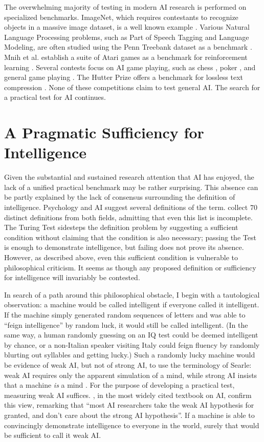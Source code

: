 The overwhelming majority of testing in modern AI research is performed on specialized benchmarks. ImageNet, which requires contestants to recognize objects in a massive image dataset, is a well known example \citep{russakovsky2015imagenet}. Various Natural Language Processing problems, such as Part of Speech Tagging and Language Modeling, are often studied using the Penn Treebank dataset as a benchmark \citep{marcus1993building}. Mnih et al. establish a suite of Atari games as a benchmark for reinforcement learning \citep{mnih2013playing}. Several contests focus on AI game playing, such as chess \citep{hayes1976world}, poker \citep{littman20062006}, and general game playing \citep{genesereth2005general}. The Hutter Prize offers a benchmark for lossless text compression \citep{mahoney2006rationale}. None of these competitions claim to test general AI. The search for a practical test for AI continues. 

\section{A Pragmatic Sufficiency for Intelligence}

Given the substantial and sustained research attention that AI has enjoyed, the lack of a unified practical benchmark may be rather surprising. This absence can be partly explained by the lack of consensus surrounding the definition of intelligence. Psychology and AI suggest several definitions of the term. \citet{legg2007collection} collect $70$ distinct definitions from both fields, admitting that even this list is incomplete. The Turing Test sidesteps the definition problem by suggesting a sufficient condition without claiming that the condition is also necessary; passing the Test is enough to demonstrate intelligence, but failing does not prove its absence. However, as described above, even this sufficient condition is vulnerable to philosophical criticism. It seems as though any proposed definition or sufficiency for intelligence will invariably be contested.

In search of a path around this philosophical obstacle, I begin with a tautological observation: a machine would be called intelligent if everyone called it intelligent. If the machine simply generated random sequences of letters and was able to ``feign intelligence'' by random luck, it would still be called intelligent. (In the same way, a human randomly guessing on an IQ test could be deemed intelligent by chance, or a non-Italian speaker visiting Italy could feign fluency by randomly blurting out syllables and getting lucky.) Such a randomly lucky machine would be evidence of weak AI, but not of strong AI, to use the terminology of Searle: weak AI requires only the apparent simulation of a mind, while strong AI insists that a machine \textit{is} a mind \citep{searle1980minds}. For the purpose of developing a practical test, measuring weak AI suffices. \citet{russell1995modern}, in the most widely cited textbook on AI, confirm this view, remarking that ``most AI researchers take the weak AI hypothesis for granted, and don't care about the strong AI hypothesis''. If a machine is able to convincingly demonstrate intelligence to everyone in the world, surely that would be sufficient to call it weak AI.

